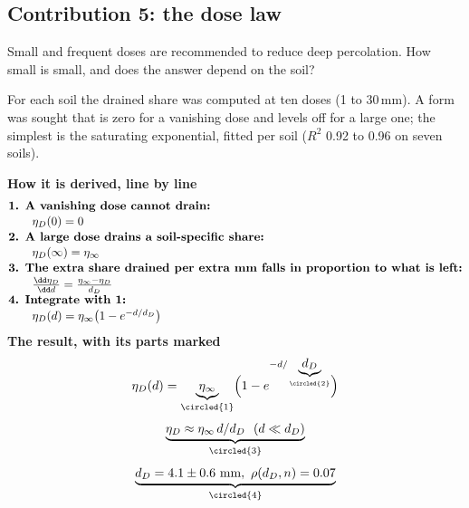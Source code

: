 \subsection{Contribution 5: the dose law}
\begin{problem}
Small and frequent doses are recommended to reduce deep percolation. How small is small, and does the answer depend on the soil?
\end{problem}
\begin{derivation}
For each soil the drained share was computed at ten doses (1 to 30\,mm). A form was sought that is zero for a vanishing dose and levels off for a large one; the simplest is the saturating exponential, fitted per soil ($R^2$ 0.92 to 0.96 on seven soils).
\end{derivation}
\begin{keyresult}
\begin{pencil}
{\small\noindent\textbf{How it is derived, line by line}
\[\begin{array}{@{}l@{}}\textbf{1. A vanishing dose cannot drain:}\\[1pt]
\qquad \eta_D(0)=0\\[1pt]
\textbf{2. A large dose drains a soil-specific share:}\\[1pt]
\qquad \eta_D(\infty)=\eta_\infty\\[1pt]
\textbf{3. The extra share drained per extra mm falls in proportion to what is left:}\\[1pt]
\qquad \frac{\dd\eta_D}{\dd d}=\frac{\eta_\infty-\eta_D}{d_D}\\[1pt]
\textbf{4. Integrate with 1:}\\[1pt]
\qquad \eta_D(d)=\eta_\infty\bigl(1-e^{-d/d_D}\bigr)
\end{array}\]}
\noindent\textbf{The result, with its parts marked}
\[\eta_D(d)=\underbrace{\eta_\infty}_{\circled{1}}\Bigl(1-e^{-d/\underbrace{d_D}_{\circled{2}}}\Bigr)\]
\[\underbrace{\eta_D\approx\eta_\infty\,d/d_D\ \ (d\ll d_D)}_{\circled{3}}\]
\[\underbrace{d_D=4.1\pm0.6\text{ mm},\ \rho(d_D,n)=0.07}_{\circled{4}}\]
\end{pencil}
\end{keyresult}
\begin{pins}
\end{pins}

